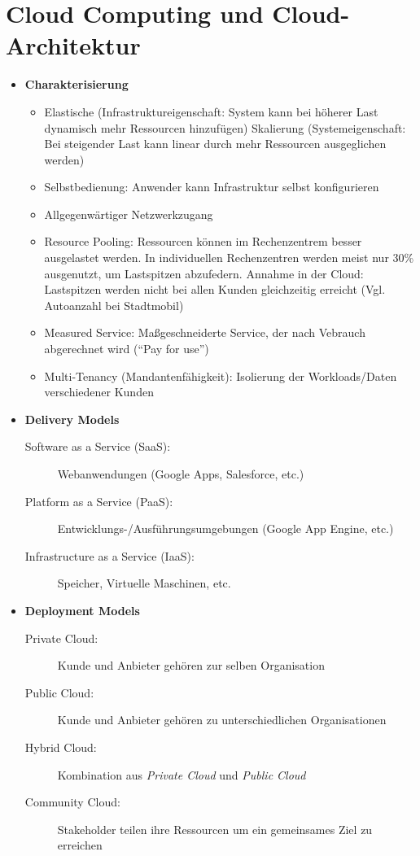 \section{Cloud Computing und Cloud-Architektur}
\begin{itemize}
	\item \textbf{Charakterisierung}
	\begin{itemize}
		\item Elastische (Infrastruktureigenschaft: System kann bei höherer Last dynamisch mehr Ressourcen hinzufügen) Skalierung (Systemeigenschaft: Bei steigender Last kann linear durch mehr Ressourcen ausgeglichen werden)
		\item Selbstbedienung: Anwender kann Infrastruktur selbst konfigurieren
		\item Allgegenwärtiger Netzwerkzugang
		\item Resource Pooling: Ressourcen können im Rechenzentrem besser ausgelastet werden. In individuellen Rechenzentren werden meist nur 30\% ausgenutzt, um Lastspitzen abzufedern. Annahme in der Cloud: Lastspitzen werden nicht bei allen Kunden gleichzeitig erreicht (Vgl. Autoanzahl bei Stadtmobil)
		\item Measured Service: Maßgeschneiderte Service, der nach Vebrauch abgerechnet wird ("`Pay for use"')
		\item Multi-Tenancy (Mandantenfähigkeit): Isolierung der Workloads/Daten verschiedener Kunden
	\end{itemize}
	\item \textbf{Delivery Models}
	\begin{description}
		\item[Software as a Service (SaaS):] Webanwendungen (Google Apps, Salesforce, etc.)
		\item[Platform as a Service (PaaS):] Entwicklungs-/Ausführungsumgebungen (Google App Engine, etc.)
		\item[Infrastructure as a Service (IaaS):] Speicher, Virtuelle Maschinen, etc.
	\end{description}
	\item \textbf{Deployment Models}
	\begin{description}
		\item[Private Cloud:] Kunde und Anbieter gehören zur selben Organisation
		\item[Public Cloud:] Kunde und Anbieter gehören zu unterschiedlichen Organisationen
		\item[Hybrid Cloud:] Kombination aus \textit{Private Cloud} und \textit{Public Cloud}
		\item[Community Cloud:] Stakeholder teilen ihre Ressourcen um ein gemeinsames Ziel zu erreichen
	\end{description}
\end{itemize}